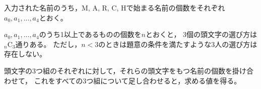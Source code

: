 \documentclass{article}
\makeatletter
\renewenvironment{proof}[1][\proofname]{\par
        \pushQED{\qed}
        \normalfont
        \topsep6\p@\@plus6\p@ \trivlist
        \item[\hskip\labelsep{\bfseries #1}\@addpunct{\bfseries}]\ignorespaces
    }{%
        \popQED\endtrivlist\@endpefalse
    }
\renewcommand{\proofname}{証明.}
\newcommand{\combination}[2]{{}_{#1} \mathrm{C}_{#2}}
\makeatother
\begin{document}
\begin{proof}
    入力された名前のうち，M, A, R, C, Hで始まる名前の個数をそれぞれ$a_0, a_1, \ldots , a_4$とおく。

    $a_0, a_1, \ldots , a_4$のうち1以上であるものの個数を$n$とおくと，
    3個の頭文字の選び方は$\combination{n}{3}$通りある。
    ただし，$n < 3$のときは題意の条件を満たすような3人の選び方は存在しない。

    頭文字の3つ組のそれぞれに対して，それらの頭文字をもつ名前の個数を掛け合わせて，
    これをすべての3つ組について足し合わせると，求める値を得る。
\end{proof}
\end{document}
